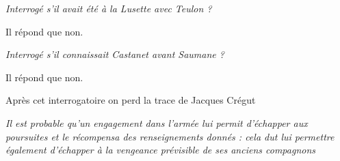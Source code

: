 \textit{Interrogé s’il avait été à la Lusette avec Teulon ?}

Il répond que non.

\vspace{0.2em}

\textit{Interrogé s’il connaissait Castanet avant Saumane ?}

Il répond que non.

\vspace{0.65em}

\begin{tcolorbox}[
  colback=white,
  colframe=black,
  boxrule=0.7pt,
  arc=0pt,
  left=0.25cm,
  right=0.25cm,
  top=0.12cm,
  bottom=0.12cm,
  boxsep=0pt
]
Après cet interrogatoire on perd la trace de Jacques Crégut

\vspace{0.35em}

\textit{Il est probable qu’un engagement dans l’armée lui permit d’échapper aux poursuites et le récompensa des renseignements donnés : cela dut lui permettre également d’échapper à la vengeance prévisible de ses anciens compagnons}
\end{tcolorbox}

